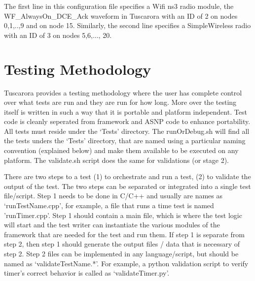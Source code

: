 The first line in this configuration file specifies a Wifi ns3 radio module, the WF\_AlwaysOn\_DCE\_Ack waveform in Tuscarora with an ID of 2 on nodes 0,1,..,9 and on node 15. Similarly, the second line specifies a SimpleWireless radio with an ID of 3 on nodes 5,6,..., 20.  





\section{Testing Methodology}

Tuscarora provides a testing methodology where the user has complete control over what tests are run and they are run for how long. More over the testing itself is written in such a way that it is portable and platform independent. Test code is cleanly seperated from framework and ASNP code to enhance portability. All tests must reside under the `Tests' directory. The runOrDebug.sh will find all the tests unders the `Tests' directory, that are named using a particular naming convention (explained below) and make them available to be executed on any platform. The validate.sh script does the same for validations (or stage 2).

There are two steps to a test (1) to orchestrate and run a test, (2) to validate the output of the test. The two steps can be separated or integrated into a single test file/script. Step 1 needs to be done in C/C++ and usually are names as `runTestName.cpp', for example, a file that runs a time test is named 'runTimer.cpp'. Step 1 should contain a main file, which is where the test logic will start and the test writer can instantiate the various modules of the framework that are needed for the test and run them. If step 1 is separate from step 2, then step 1 should generate the output files / data that is necessary of step 2. Step 2 files can be implemented in any language/script, but should be named as `validateTestName.*'. For example, a python validation script to verify timer's correct behavior is called as `validateTimer.py'. 

